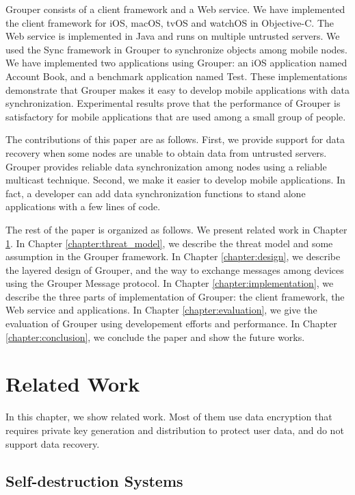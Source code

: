 \documentclass[a4paper,11pt]{report}
\begin{document}
Grouper consists of a client framework and a Web service.
We have implemented the client framework for iOS, macOS, tvOS and watchOS in Objective-C.
The Web service is implemented in Java and runs on multiple untrusted servers.
We used the Sync\cite{sync} framework in Grouper to synchronize objects among mobile nodes.
We have implemented two applications using Grouper: an iOS application named Account Book, and a benchmark application named Test.
These implementations demonstrate that Grouper makes it easy to develop mobile applications with data synchronization.
Experimental results prove that the performance of Grouper is satisfactory for mobile applications that are used among a small group of people.

The contributions of this paper are as follows.
First, we provide support for data recovery when some nodes are unable to obtain data from untrusted servers.
Grouper provides reliable data synchronization among nodes using a reliable multicast technique.
Second, we make it easier to develop mobile applications.
In fact, a developer can add data synchronization functions to stand alone applications with a few lines of code.

The rest of the paper is organized as follows.
We present related work in Chapter \ref{chapter:related_work}.
In Chapter \ref{chapter:threat_model}, we describe the threat model and some assumption in the Grouper framework.
In Chapter \ref{chapter:design}, we describe the layered design of Grouper, and the way to exchange messages among devices using the Grouper Message protocol.
In Chapter \ref{chapter:implementation}, we describe the three parts of implementation of Grouper: the client framework, the Web service and applications.
In Chapter \ref{chapter:evaluation}, we give the evaluation of Grouper using developement efforts and performance.
In Chapter \ref{chapter:conclusion}, we conclude the paper and show the future works.

\chapter{Related Work} \label{chapter:related_work}

In this chapter, we show related work. 
Most of them use data encryption that requires private key generation and distribution to protect user data, and do not support data recovery.

\section{Self-destruction Systems}
\end{document}
